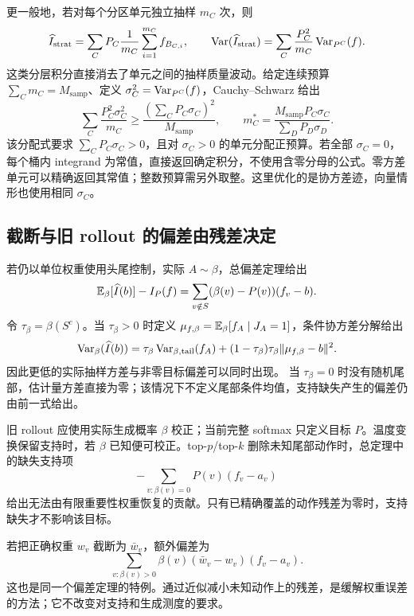 更一般地，若对每个分区单元独立抽样 $m_C$ 次，则
\begin{equation*}
 \widehat I_{\mathrm{strat}}
 =\sum_CP_C\frac1{m_C}\sum_{i=1}^{m_C}f_{B_{C,i}},\qquad
 \operatorname{Var}(\widehat I_{\mathrm{strat}})
 =\sum_C\frac{P_C^2}{m_C}\operatorname{Var}_{P^C}(f).
\end{equation*}
这类分层积分直接消去了单元之间的抽样质量波动。给定连续预算 $\sum_Cm_C=M_{\mathrm{samp}}$、定义 $\sigma_C^2=\operatorname{Var}_{P^C}(f)$，Cauchy--Schwarz 给出
\begin{equation*}
 \sum_C\frac{P_C^2\sigma_C^2}{m_C}
 \ge\frac{(\sum_CP_C\sigma_C)^2}{M_{\mathrm{samp}}},
 \qquad m_C^*=\frac{M_{\mathrm{samp}}P_C\sigma_C}{\sum_DP_D\sigma_D}.
\end{equation*}
该分配式要求 $\sum_CP_C\sigma_C>0$，且对 $\sigma_C>0$ 的单元分配正预算。若全部 $\sigma_C=0$，每个桶内 integrand 为常值，直接返回确定积分，不使用含零分母的公式。零方差单元可以精确返回其常值；整数预算需另外取整。这里优化的是协方差迹，向量情形也使用相同 $\sigma_C$。

\subsection{截断与旧 rollout 的偏差由残差决定}
若仍以单位权重使用头尾控制，实际 $A\sim\beta$，总偏差定理给出
\begin{equation}\label{est:eq:kl-wrong-measure-bias}
 \mathbb E_\beta[\widehat I(b)]-I_P(f)
 =\sum_{v\notin S}(\beta(v)-P(v))(f_v-b).
\end{equation}
令 $\tau_\beta=\beta(S^c)$。当 $\tau_\beta>0$ 时定义 $\mu_{f,\beta}=\mathbb E_\beta[f_A\mid J_A=1]$，条件协方差分解给出
\begin{equation}\label{est:eq:kl-wrong-measure-var}
 \operatorname{Var}_\beta(\widehat I(b))
 =\tau_\beta\operatorname{Var}_{\beta,\mathrm{tail}}(f_A)
 +(1-\tau_\beta)\tau_\beta\|\mu_{f,\beta}-b\|^2.
\end{equation}
因此更低的实际抽样方差与非零目标偏差可以同时出现。
当 $\tau_\beta=0$ 时没有随机尾部，估计量方差直接为零；该情况下不定义尾部条件均值，支持缺失产生的偏差仍由前一式给出。

旧 rollout 应使用实际生成概率 $\beta$ 校正；当前完整 softmax 只定义目标 $P$。温度变换保留支持时，若 $\beta$ 已知便可校正。top-$p$/top-$k$ 删除未知尾部动作时，总定理中的缺失支持项
\begin{equation*}
 -\sum_{v:\beta(v)=0}P(v)(f_v-a_v)
\end{equation*}
给出无法由有限重要性权重恢复的贡献。只有已精确覆盖的动作残差为零时，支持缺失才不影响该目标。

若把正确权重 $w_v$ 截断为 $\bar w_v$，额外偏差为
\begin{equation*}
 \sum_{v:\beta(v)>0}\beta(v)(\bar w_v-w_v)(f_v-a_v).
\end{equation*}
这也是同一个偏差定理的特例。通过近似减小未知动作上的残差，是缓解权重误差的方法；它不改变对支持和生成测度的要求。

